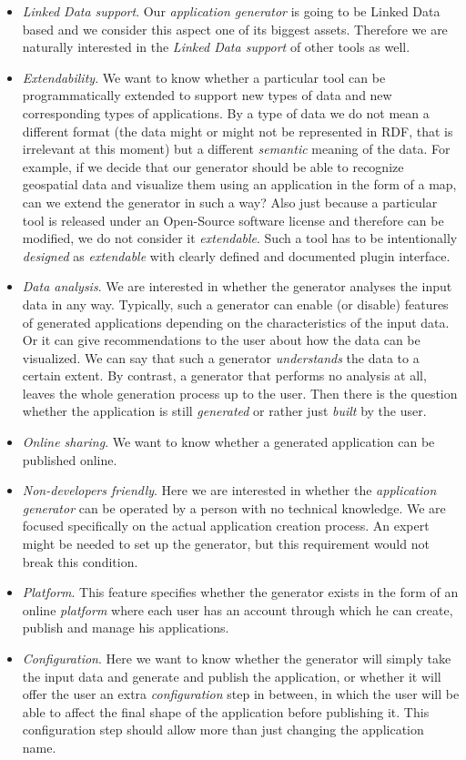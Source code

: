 \begin{itemize}
\item \emph{Linked Data support}. Our \emph{application generator} is going to be Linked Data based and we consider this aspect one of its biggest assets. Therefore we are naturally interested in the \emph{Linked Data support} of other tools as well.
\item \emph{Extendability}. We want to know whether a particular tool can be programmatically extended to support new types of data and new corresponding types of applications. By a type of data we do not mean a different format (the data might or might not be represented in RDF, that is irrelevant at this moment) but a different \emph{semantic} meaning of the data. For example, if we decide that our generator should be able to recognize geospatial data and visualize them using an application in the form of a map, can we extend the generator in such a way? Also just because a particular tool is released under an Open-Source software license and therefore can be modified, we do not consider it \emph{extendable}. Such a tool has to be intentionally \emph{designed} as \emph{extendable} with clearly defined and documented plugin interface.
\item \emph{Data analysis}. We are interested in whether the generator analyses the input data in any way. Typically, such a generator can enable (or disable)  features of generated applications depending on the characteristics of the input data. Or it can give recommendations to the user about how the data can be visualized. We can say that such a generator \emph{understands} the data to a certain extent. By contrast, a generator that performs no analysis at all, leaves the whole generation process up to the user. Then there is the question whether the application is still \emph{generated} or rather just \emph{built} by the user.
\item \emph{Online sharing}. We want to know whether a generated application can be published online.
\item \emph{Non-developers friendly}. Here we are interested in whether the \emph{application generator} can be operated by a person with no technical knowledge. We are focused specifically on the actual application creation process. An expert might be needed to set up the generator, but this requirement would not break this condition.
\item \emph{Platform}. This feature specifies whether the generator exists in the form of an online \emph{platform} where each user has an account through which he can create, publish and manage his applications.
\item \emph{Configuration}. Here we want to know whether the generator will simply take the input data and generate and publish the application, or whether it will offer the user an extra \emph{configuration} step in between, in which the user will be able to affect the final shape of the application before publishing it. This configuration step should allow more than just changing the application name.
\end{itemize}

